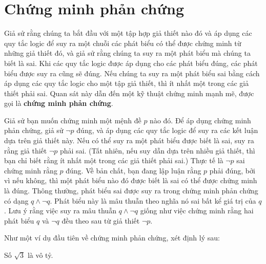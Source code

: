 \section{Chứng minh phản chứng}

Giả sử rằng chúng ta bắt đầu với một tập hợp giả thiết nào đó và áp dụng các quy tắc logic để suy ra một chuỗi các phát biểu có thể được chứng minh từ những giả thiết đó, và giả sử rằng chúng ta suy ra một phát biểu mà chúng ta biết là sai. Khi các quy tắc logic được áp dụng cho các phát biểu đúng, các phát biểu được suy ra cũng sẽ đúng. Nếu chúng ta suy ra một phát biểu sai bằng cách áp dụng các quy tắc logic cho một tập giả thiết, thì ít nhất một trong các giả thiết phải sai. Quan sát này dẫn đến một kỹ thuật chứng minh mạnh mẽ, được gọi là \textbf{chứng minh phản chứng}.

Giả sử bạn muốn chứng minh một mệnh đề $p$ nào đó. Để áp dụng chứng minh phản chứng, giả sử $\neg p$ đúng, và áp dụng các quy tắc logic để suy ra các kết luận dựa trên giả thiết này. Nếu có thể suy ra một phát biểu được biết là sai, suy ra rằng giả thiết $\neg p$ phải sai. (Tất nhiên, nếu suy dẫn dựa trên nhiều giả thiết, thì bạn chỉ biết rằng ít nhất một trong các giả thiết phải sai.) Thực tế là $\neg p$ sai chứng minh rằng $p$ đúng. Về bản chất, bạn đang lập luận rằng $p$ phải đúng, bởi vì nếu không, thì một phát biểu nào đó được biết là sai có thể được chứng minh là đúng. Thông thường, phát biểu sai được suy ra trong chứng minh phản chứng có dạng $q \wedge \neg q$. Phát biểu này là mâu thuẫn theo nghĩa nó sai bất kể giá trị của $q$. Lưu ý rằng việc suy ra mâu thuẫn $q \wedge \neg q$ giống như việc chứng minh rằng hai phát biểu $q$ và $\neg q$ đều theo sau từ giả thiết $\neg p$.

Như một ví dụ đầu tiên về chứng minh phản chứng, xét định lý sau:

\begin{theorem}
Số $\sqrt{3}$ là vô tỷ.
\end{theorem}

